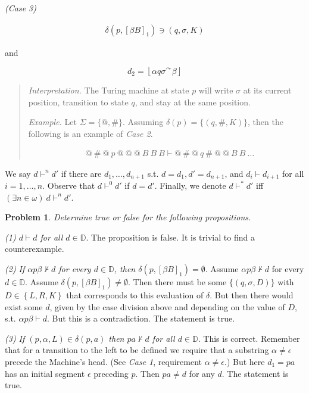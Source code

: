 \documentclass[a4paper, 12pt]{article}
\newtheorem{problem}{Problem}
\newtheorem{problem}{Problem}
\begin{document}
\textit{(Case 3)} 

\begin{align*}
    \delta \left( p, \left[ \beta B \right]_1  \right) \ni (q, \sigma, K)
\end{align*}

and 

$$d_2 = \left\lfloor \alpha q \sigma {}^{\curvearrowright} \beta  \right\rfloor $$

\small 
\begin{quote}
    \textit{Interpretation.} The Turing machine at state $p$ will write $\sigma$
    at its current position, transition to state $q$, and stay at the same
    position.

    \textit{Example.} Let $\Sigma = \{ @, \#\}$. Assuming $\delta (p) = \{ (q,
    \#, K) \}$, then the following is an example of
    \textit{Case 2}.
    
    \begin{align*}
        &@ ~ \# ~ @ ~ p ~ @ ~ @ ~ @ ~ B ~ B ~ B \vdash  @ ~ \# ~@ ~ q ~ \# ~  @ ~
        @~ B ~ B
        ~ \ldots
    \end{align*}
\end{quote}
\normalsize 

We say $d \vdash^n d'$ if there are $d_1, \ldots, d_{n+1}$ s.t. $d = d_1, d' =
d_{n+1}$, and $d_i \vdash d_{i + 1}$ for all $i = 1, \ldots, n$. Observe that $d
\vdash^0 d'$ if $d = d'$. Finally, we denote $d \vdash^{*} d'$ iff $(\exists n
\in \omega) ~ d \vdash^n d'$.

\begin{problem}
    Determine true or false for the following propositions.
\end{problem}

\textit{(1) $d \vdash d$ for all $d \in \mathbb{D}$}. The proposition is false.
It is trivial to find a counterexample.

\textit{(2) If $\alpha p \beta  \not\vdash  d$ for every $d \in \mathbb{D}$,
then $\delta(p, [\beta B]_1) = \emptyset$}. Assume $\alpha p \beta \not\vdash d$
for every $d \in \mathbb{D}$. Assume $\delta(p, [\beta B]_1) \neq \emptyset$.
Then there must be some $\{(q, \sigma, D)\}$ with $D \in \left\{ L, R, K
\right\} $ that corresponds to this evaluation of $\delta$. But then there would
exist some $d$, given by the case division above and depending on the value of
$D$, s.t. $\alpha p \beta \vdash d$. But this is a contradiction. The statement
is true.

\textit{(3) If $(p, \alpha, L) \in \delta(p, a)$ then $pa \not\vdash d$ for all
$d \in \mathbb{D}$}. This is correct. Remember that for a transition to the left
to be defined we require that a substring $\alpha \neq \epsilon$ precede the
Machine's head. (See \textit{Case 1}, requirement $\alpha \neq \epsilon$.) But
here $d_1 = pa$ has an initial segment $\epsilon$ preceding $p$. Then $pa \neq
d$ for any $d$. The statement is true.
\end{document}
